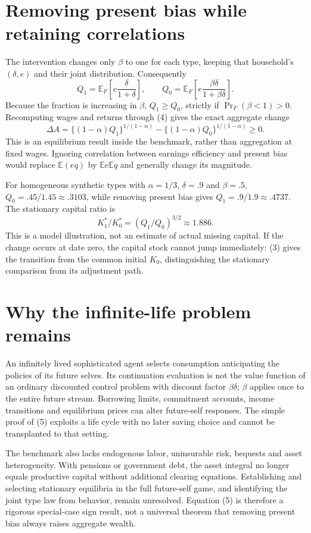 \documentclass[11pt]{article}
\newcommand{\E}{\mathbb E}
\begin{document}
\section*{Removing present bias while retaining correlations}
The intervention changes only $\beta$ to one for each type, keeping that household's $(\delta,e)$ and their joint distribution. Consequently
\[
 Q_1=\E_F\left[e\frac{\delta}{1+\delta}\right],\qquad
 Q_0=\E_F\left[e\frac{\beta\delta}{1+\beta\delta}\right].
\]
Because the fraction is increasing in $\beta$, $Q_1\geq Q_0$, strictly if $\Pr_F(\beta<1)>0$. Recomputing wages and returns through (4) gives the exact aggregate change
\[
 \Delta A=\{(1-\alpha)Q_1\}^{1/(1-\alpha)}
          -\{(1-\alpha)Q_0\}^{1/(1-\alpha)}\geq0.      \tag{5}
\]
This is an equilibrium result inside the benchmark, rather than aggregation at fixed wages. Ignoring correlation between earnings efficiency and present bias would replace $\E(e q)$ by $\E e\E q$ and generally change its magnitude.

For homogeneous synthetic types with $\alpha=1/3$, $\delta=.9$ and $\beta=.5$, $Q_0=.45/1.45\approx.3103$, while removing present bias gives $Q_1=.9/1.9\approx.4737$. The stationary capital ratio is
\[
 K_1^*/K_0^*=(Q_1/Q_0)^{3/2}\approx1.886.
\]
This is a model illustration, not an estimate of actual missing capital. If the change occurs at date zero, the capital stock cannot jump immediately: (3) gives the transition from the common initial $K_0$, distinguishing the stationary comparison from its adjustment path.

\section*{Why the infinite-life problem remains}
An infinitely lived sophisticated agent selects consumption anticipating the policies of its future selves. Its continuation evaluation is not the value function of an ordinary discounted control problem with discount factor $\beta\delta$; $\beta$ applies once to the entire future stream. Borrowing limits, commitment accounts, income transitions and equilibrium prices can alter future-self responses. The simple proof of (5) exploits a life cycle with no later saving choice and cannot be transplanted to that setting.

The benchmark also lacks endogenous labor, uninsurable risk, bequests and asset heterogeneity. With pensions or government debt, the asset integral no longer equals productive capital without additional clearing equations. Establishing and selecting stationary equilibria in the full future-self game, and identifying the joint type law from behavior, remain unresolved. Equation (5) is therefore a rigorous special-case sign result, not a universal theorem that removing present bias always raises aggregate wealth.
\end{document}
